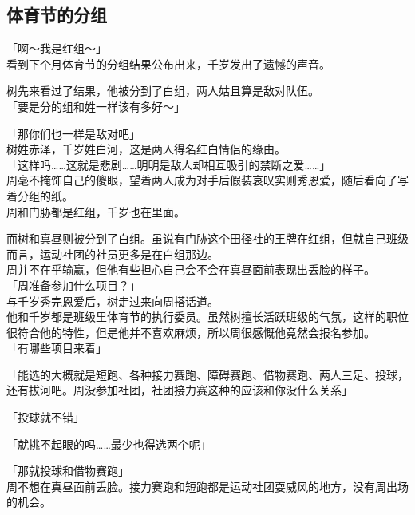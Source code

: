 \subsection{体育节的分组}

「啊～我是红组～」\\

看到下个月体育节的分组结果公布出来，千岁发出了遗憾的声音。

树先来看过了结果，他被分到了白组，两人姑且算是敌对队伍。\\

「要是分的组和姓一样该有多好～」

「那你们也一样是敌对吧」\\

树姓赤泽，千岁姓白河，这是两人得名红白情侣的缘由。\\

「这样吗……这就是悲剧……明明是敌人却相互吸引的禁断之爱……」\\

周毫不掩饰自己的傻眼，望着两人成为对手后假装哀叹实则秀恩爱，随后看向了写着分组的纸。\\

周和门胁都是红组，千岁也在里面。

而树和真昼则被分到了白组。虽说有门胁这个田径社的王牌在红组，但就自己班级而言，运动社团的社员更多是在白组那边。\\

周并不在乎输赢，但他有些担心自己会不会在真昼面前表现出丢脸的样子。\\

「周准备参加什么项目？」\\

与千岁秀完恩爱后，树走过来向周搭话道。\\

他和千岁都是班级里体育节的执行委员。虽然树擅长活跃班级的气氛，这样的职位很符合他的特性，但是他并不喜欢麻烦，所以周很感慨他竟然会报名参加。\\

「有哪些项目来着」

「能选的大概就是短跑、各种接力赛跑、障碍赛跑、借物赛跑、两人三足、投球，还有拔河吧。周没参加社团，社团接力赛这种的应该和你没什么关系」

「投球就不错」

「就挑不起眼的吗……最少也得选两个呢」

「那就投球和借物赛跑」\\

周不想在真昼面前丢脸。接力赛跑和短跑都是运动社团耍威风的地方，没有周出场的机会。

